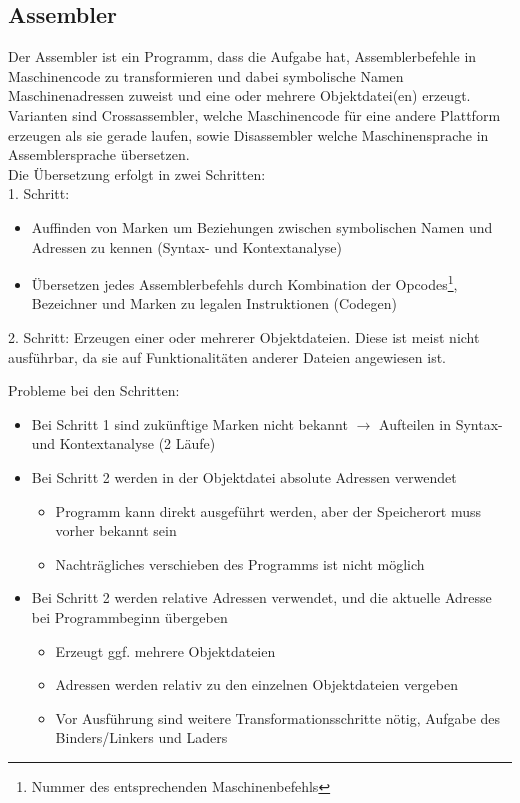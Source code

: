 \documentclass[a4paper,12pt,leqno]{article}
\begin{document}
\subsection{Assembler}
Der Assembler ist ein Programm, dass die Aufgabe hat, Assemblerbefehle in Maschinencode zu transformieren und dabei symbolische Namen Maschinenadressen zuweist und eine oder mehrere Objektdatei(en) erzeugt.\\
Varianten sind Crossassembler, welche Maschinencode für eine andere Plattform erzeugen als sie gerade laufen, sowie Disassembler welche Maschinensprache in Assemblersprache übersetzen.\\

Die Übersetzung erfolgt in zwei Schritten:\\
1. Schritt:
\begin{itemize}
\item Auffinden von Marken um Beziehungen zwischen symbolischen Namen und Adressen zu kennen (Syntax- und Kontextanalyse)
\item Übersetzen jedes Assemblerbefehls durch Kombination der Opcodes\footnote{Nummer des entsprechenden Maschinenbefehls}, Bezeichner und Marken zu legalen Instruktionen (Codegen)
\end{itemize}
2. Schritt: Erzeugen einer oder mehrerer Objektdateien. Diese ist meist nicht ausführbar, da sie auf Funktionalitäten anderer Dateien angewiesen ist.

Probleme bei den Schritten:
\begin{itemize}
\item Bei Schritt 1 sind zukünftige Marken nicht bekannt $\rightarrow$ Aufteilen in Syntax- und Kontextanalyse (2 Läufe)
\item Bei Schritt 2 werden in der Objektdatei absolute Adressen verwendet
	\begin{itemize}
	\item Programm kann direkt ausgeführt werden, aber der Speicherort muss vorher bekannt sein
	\item Nachträgliches verschieben des Programms ist nicht möglich
	\end{itemize}
\item Bei Schritt 2 werden relative Adressen verwendet, und die aktuelle Adresse bei Programmbeginn übergeben
	\begin{itemize}
	\item Erzeugt ggf. mehrere Objektdateien
	\item Adressen werden relativ zu den einzelnen Objektdateien vergeben
	\item Vor Ausführung sind weitere Transformationsschritte nötig, Aufgabe des Binders/Linkers und Laders
	\end{itemize}
\end{itemize}
\end{document}
